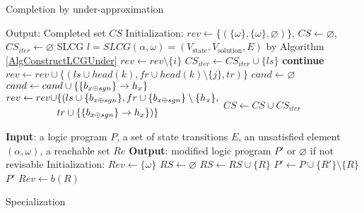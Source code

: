 \begin{algorithm}[ht]
\caption{Completion by under-approximation}\label{algComUnder}
\begin{algorithmic}
\State Output: Completed set $CS$ %
\State Initialization: $rev\gets\{(\{\omega\},\{\omega\},\varnothing)\}$, $CS\gets \varnothing$, $CS_{iter}\gets \varnothing$
\Do
\State SLCG $l=SLCG(\alpha,\omega)=(V_{\mathrm{state}},V_{\mathrm{solution}}, E)$ by Algorithm \ref{AlgConstructLCGUnder}
        \State $rev\gets rev \setminus\{i\}$
            \State $CS_{iter}\gets CS_{iter}\cup \{ls\}$
            \State \textbf{continue}
        \EndIf
                    \State $rev\gets rev\cup \{(ls\cup head(k), fr\cup head(k)\setminus \{j\},tr)\}$
                \EndIf
            \EndFor
        \EndFor
        \State $cand\gets\varnothing$
                \State $cand \gets cand\cup\{\acm{b_{x \oplus sgn}}{h_{1-x}}{h_x}\}$
                \State 
                    $\begin{aligned}
                        rev\gets rev\cup &\{(ls\cup \{b_{x \oplus sgn}\}, fr\cup \{b_{x \oplus sgn}\}\setminus \{h_x\},\\
                        &tr\cup\{\acm{b_{x \oplus sgn}}{h_{1-x}}{h_x}\})\}
                    \end{aligned}$
            \EndIf
        \EndFor
    \EndFor
\EndWhile
\State $CS\gets CS\cup CS_{iter}$
\State {}
\end{algorithmic}
\end{algorithm}

\begin{algorithm}[ht]
\begin{algorithmic}
    \State \textbf{Input}: a logic program $P$, a set of state transitions $E$, an unsatisfied element $(\alpha,\omega)$, a reachable set $Re$
    \State \textbf{Output}: modified logic program $P'$ or $\varnothing$ if not revisable
    \State Initialization: $Rev\gets\{\omega\}$
    \Do
    \State $RS\gets \varnothing$
            \State $RS\gets RS\cup \{R\}$
        \EndIf
    \EndFor
            \State $P'\gets P\cup \{R'\}\setminus \{R\}$
                    \Return $P'$
                \EndIf
            \EndIf
        \EndFor
    \EndFor
        \State $Rev\gets b(R)$
    \EndFor
\end{algorithmic}
\caption{Specialization}\label{alg:specialization}
\end{algorithm}

